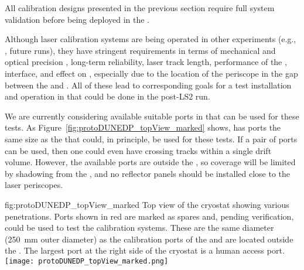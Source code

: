 
All calibration designs presented in the previous section require full system validation before being deployed in the  . 

Although laser calibration systems are being operated in other  experiments (e.g., , future  runs), they have stringent requirements in terms of mechanical and optical precision , long-term reliability, laser track length, performance of the ,  interface, and effect on \efield, especially due to the location of the periscope in the gap between the  and . All of these lead to corresponding goals for a test installation and operation in  that could be done in the post-LS2 run. 

We are currently considering available suitable ports in  that can be used for these tests.
As Figure~\ref{fig:protoDUNEDP_topView_marked} shows,  has ports the same size as the   that could, in principle, be used for these tests.  If a pair of ports can be used, then one could even have crossing tracks within a single drift volume. However, the available ports are outside the , so coverage will be limited by shadowing from the , and no reflector panels should be installed close to the laser periscopes.

\begin{dunefigure}{fig:protoDUNEDP_topView_marked}
{Top view of the  cryostat showing various penetrations. Ports shown in red are marked as spares and, pending verification, could be used to test the calibration systems. These are the same diameter (\SI{250}{\milli\m} outer diameter) as the calibration ports of the   and are located outside the . The largest port at the right side of the cryostat is a human access port.}
\texttt{[image: protoDUNEDP\_topView\_marked.png]}
\end{dunefigure}

